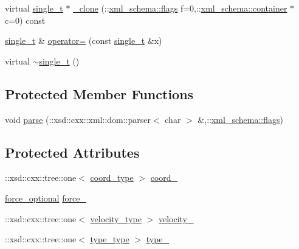 \begin{DoxyCompactItemize}
\item 
virtual \hyperlink{classsingle__t}{single\+\_\+t} $\ast$ \hyperlink{classsingle__t_abe99b1388d184b22b23f5e42cb046945}{\+\_\+clone} (\+::\hyperlink{namespacexml__schema_a0612287d030cb2732d31a45b258fdc87}{xml\+\_\+schema\+::flags} f=0,\+::\hyperlink{namespacexml__schema_ada9aa30dc722e93ee2ed7243085402a5}{xml\+\_\+schema\+::container} $\ast$c=0) const 
\item 
\hyperlink{classsingle__t}{single\+\_\+t} \& \hyperlink{classsingle__t_a1b34e3eb88ee12e34caa75518e6f03eb}{operator=} (const \hyperlink{classsingle__t}{single\+\_\+t} \&x)
\item 
virtual \hyperlink{classsingle__t_a4771d9de9082d49504b2836193853042}{$\sim$single\+\_\+t} ()
\end{DoxyCompactItemize}
\subsection*{Protected Member Functions}
\begin{DoxyCompactItemize}
\item 
void \hyperlink{classsingle__t_a24857efb767f94282d199e281d197c3a}{parse} (\+::xsd\+::cxx\+::xml\+::dom\+::parser$<$ char $>$ \&,\+::\hyperlink{namespacexml__schema_a0612287d030cb2732d31a45b258fdc87}{xml\+\_\+schema\+::flags})
\end{DoxyCompactItemize}
\subsection*{Protected Attributes}
\begin{DoxyCompactItemize}
\item 
\+::xsd\+::cxx\+::tree\+::one$<$ \hyperlink{classsingle__t_a07d764e683fbb0e8ddd97945f2c01270}{coord\+\_\+type} $>$ \hyperlink{classsingle__t_a88c8130f542d90b17800fe59ed9aabed}{coord\+\_\+}
\item 
\hyperlink{classsingle__t_a33128be3fe89ddbab885d0a205d35888}{force\+\_\+optional} \hyperlink{classsingle__t_a1e9b2a89d19cfdd6842b3611c8dac6cc}{force\+\_\+}
\item 
\+::xsd\+::cxx\+::tree\+::one$<$ \hyperlink{classsingle__t_a5aa793b7c32fb659668bbac250ce7d6b}{velocity\+\_\+type} $>$ \hyperlink{classsingle__t_ae84160509acab4c517aa11c096dd54dd}{velocity\+\_\+}
\item 
\+::xsd\+::cxx\+::tree\+::one$<$ \hyperlink{classsingle__t_a6ae5872727b5902a3907ef699bcc5ee0}{type\+\_\+type} $>$ \hyperlink{classsingle__t_a4df4719166dbbf3b754b192f386aa974}{type\+\_\+}
\end{DoxyCompactItemize}


